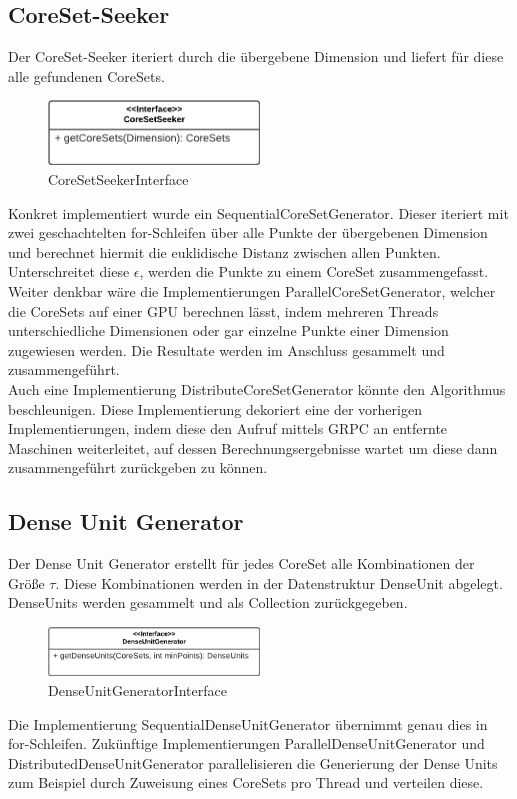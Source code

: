 \subsection{CoreSet-Seeker}
Der CoreSet-Seeker iteriert durch die übergebene Dimension und liefert für diese alle gefundenen CoreSets.
\begin{figure}[h]
	\centering
	\includegraphics[width=0.5\textwidth]{./Bilder/Restrukturierung/CoreSetSeeker.png}
	\caption{CoreSetSeekerInterface}
\end{figure}
Konkret implementiert wurde ein SequentialCoreSetGenerator. Dieser iteriert mit zwei geschachtelten for-Schleifen über
alle Punkte der übergebenen Dimension und berechnet hiermit die euklidische Distanz zwischen allen Punkten.
Unterschreitet diese $\epsilon$, werden die Punkte zu einem CoreSet zusammengefasst.\\
Weiter denkbar wäre die Implementierungen ParallelCoreSetGenerator, welcher die CoreSets auf einer GPU berechnen lässt,
indem mehreren Threads unterschiedliche Dimensionen oder gar einzelne Punkte einer Dimension zugewiesen werden. Die
Resultate werden im Anschluss gesammelt und zusammengeführt.\\
Auch eine Implementierung DistributeCoreSetGenerator könnte den Algorithmus beschleunigen. Diese Implementierung
dekoriert eine der vorherigen Implementierungen, indem diese den Aufruf mittels GRPC an entfernte Maschinen
weiterleitet, auf dessen Berechnungsergebnisse wartet um diese dann zusammengeführt zurückgeben zu können.

\subsection{Dense Unit Generator}
Der Dense Unit Generator erstellt für jedes CoreSet alle Kombinationen der Größe $\tau$. Diese Kombinationen werden in
der Datenstruktur DenseUnit abgelegt. DenseUnits werden gesammelt und als Collection zurückgegeben.
\begin{figure}[h]
	\centering
	\includegraphics[width=0.5\textwidth]{./Bilder/Restrukturierung/DenseUnitGenerator.png}
	\caption{DenseUnitGeneratorInterface}
\end{figure}
Die Implementierung SequentialDenseUnitGenerator übernimmt genau dies in for-Schleifen. Zukünftige Implementierungen
ParallelDenseUnitGenerator und DistributedDenseUnitGenerator parallelisieren die Generierung der Dense Units zum
Beispiel durch Zuweisung eines CoreSets pro Thread und verteilen diese.

